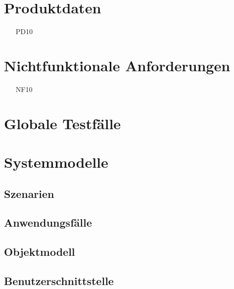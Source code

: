 \documentclass[titlepage=true, parskip=full]{scrartcl}
\begin{document}
\section{Produktdaten}
\begin{itemize}[nosep]
	\item[PD10]
\end{itemize}

\section{Nichtfunktionale Anforderungen}
\begin{itemize}[nosep]
\item[NF10]
\end{itemize}

\section{Globale Testfälle}
\section{Systemmodelle}

\subsection{Szenarien}

\subsection{Anwendungsfälle}

\begin{center}
\resizebox{\textwidth}{!} {
	
}
\end{center}

\subsection{Objektmodell}

\subsection{Benutzerschnittstelle}


\end{document}
